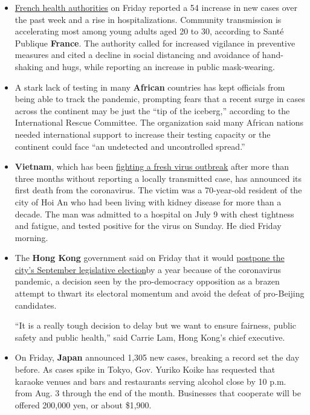 \begin{itemize}
\item
  \href{https://www.santepubliquefrance.fr/maladies-et-traumatismes/maladies-et-infections-respiratoires/infection-a-coronavirus/documents/bulletin-national/covid-19-point-epidemiologique-du-30-juillet-2020}{French
  health authorities} on Friday reported a 54 increase in new cases over
  the past week and a rise in hospitalizations. Community transmission
  is accelerating most among young adults aged 20 to 30, according to
  Santé Publique \textbf{France}. The authority called for increased
  vigilance in preventive measures and cited a decline in social
  distancing and avoidance of hand-shaking and hugs, while reporting an
  increase in public mask-wearing.
\item
  A stark lack of testing in many \textbf{African} countries has kept
  officials from being able to track the pandemic, prompting fears that
  a recent surge in cases across the continent may be just the ``tip of
  the iceberg,'' according to the International Rescue Committee. The
  organization said many African nations needed international support to
  increase their testing capacity or the continent could face ``an
  undetected and uncontrolled spread.''
\item
  \textbf{Vietnam}, which has been
  \href{https://www.nytimes.com/2020/07/29/world/asia/coronavirus-vietnam.html}{fighting
  a fresh virus outbreak} after more than three months without reporting
  a locally transmitted case, has announced its first death from the
  coronavirus. The victim was a 70-year-old resident of the city of Hoi
  An who had been living with kidney disease for more than a decade. The
  man was admitted to a hospital on July 9 with chest tightness and
  fatigue, and tested positive for the virus on Sunday. He died Friday
  morning.
\item
  The \textbf{Hong Kong} government said on Friday that it would
  \href{https://www.nytimes.com/2020/07/31/world/asia/hong-kong-election-delayed.html}{postpone
  the city's September legislative election}by a year because of the
  coronavirus pandemic, a decision seen by the pro-democracy opposition
  as a brazen attempt to thwart its electoral momentum and avoid the
  defeat of pro-Beijing candidates.

  ``It is a really tough decision to delay but we want to ensure
  fairness, public safety and public health,'' said Carrie Lam, Hong
  Kong's chief executive.
\item
  On Friday, \textbf{Japan} announced 1,305 new cases, breaking a record
  set the day before. As cases spike in Tokyo, Gov. Yuriko Koike has
  requested that karaoke venues and bars and restaurants serving alcohol
  close by 10 p.m. from Aug. 3 through the end of the month. Businesses
  that cooperate will be offered 200,000 yen, or about \$1,900.
\end{itemize}

